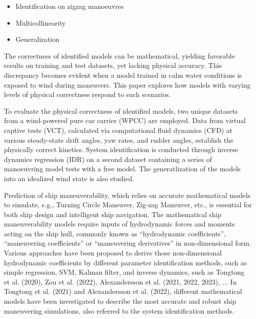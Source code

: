 \begin{itemize}
    \item Identification on zigzag manoeuvres
\end{itemize}

%
\begin{itemize}
    \item Multicollinearity
    \item Generalization
\end{itemize}
The correctness of identified models can be mathematical, yielding favorable results on training and test datasets, yet lacking physical accuracy. This discrepancy becomes evident when a model trained in calm water conditions is exposed to wind during maneuvers. This paper explores how models with varying levels of physical correctness respond to such scenarios.

%
To evaluate the physical correctness of identified models, two unique datasets from a wind-powered pure car carrier (WPCC) are employed. Data from virtual captive tests (VCT), calculated via computational fluid dynamics (CFD) at various steady-state drift angles, yaw rates, and rudder angles, establish the physically correct kinetics. System identification is conducted through inverse dynamics regression (IDR) on a second dataset containing a series of manoeuvring model tests with a free model. The generatlization of the models into an idealized wind state is also studied. 

Prediction of ship maneuverability, which relies on accurate mathematical models to simulate, e.g., Turning Circle Maneuver, Zig-zag Maneuver, etc., is essential for both ship design and intelligent ship navigation. The mathematical ship maneuverability models require inputs of hydrodynamic forces and moments acting on the ship hull, commonly known as “hydrodynamic coefficients”, “maneuvering coefficients” or “maneuvering derivatives” in non-dimensional form. Various approaches have been proposed to derive those non-dimensional hydrodynamic coefficients by different parameter identification methods, such as simple regression, SVM, Kalman filter, and inverse dynamics, such as Tongtong et al. (2020), Zou et al. (2022), Alexandersson et al. (2021, 2022, 2023), ... In Tongtong et al. (2021) and Alexandersson et al. (2022), different mathematical models have been investigated to describe the most accurate and robust ship maneuvering simulations, also referred to the system identification methods.

